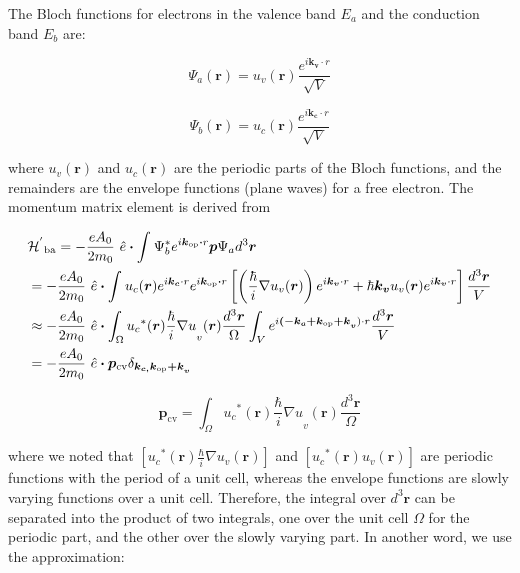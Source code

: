 The Bloch functions for electrons in the valence band \(E_{a}\) and the
conduction band \(E_{b}\) are:

\begin{equation}
\Psi_{a}\left( \bm{r} \right) = u_{v}(\bm{r})\frac{e^{i\bm{k}_{\bm{v}} \cdot r}}{\sqrt{V}}
\end{equation}

\begin{equation}
\Psi_{b}\left( \bm{r} \right) = u_{c}(\bm{r})\frac{e^{i\bm{k}_{\bm{c}} \cdot r}}{\sqrt{V}}
\end{equation}

where \(u_{v}(\bm{r})\) and \(u_{c}(\bm{r})\) are the periodic
parts of the Bloch functions, and the remainders are the envelope
functions (plane waves) for a free electron. The momentum matrix element
is derived from

\begin{eqnarray}
  & {\HAM^{'}}_{\text{ba}} = - \frac{eA_{0}}{2m_{0}}\bm{\ }\hat{e}\bm{\cdot}\int_{}^{}{\Psi_{b}^{*}e^{i\bm{k}_{\bm{\text{op}}}\bm{\cdot}r}\bm{p}\Psi_{a}d^{3}\bm{r}} \nonumber \\
  & = - \frac{eA_{0}}{2m_{0}}\bm{\ }\hat{e}\bm{\cdot}\int_{}^{}{u_{c}(\bm{r})e^{i\bm{k}_{\bm{c}} \cdot r}e^{i\bm{k}_{\bm{\text{op}}}\bm{\cdot}r}\left\lbrack \left( \frac{\hbar}{i}\nabla u_{v}(\bm{r}) \right)e^{i\bm{k}_{\bm{v}} \cdot r} + \hbar\bm{k}_{\bm{v}}u_{v}(\bm{r})e^{i\bm{k}_{\bm{v}} \cdot r} \right\rbrack\frac{d^{3}\bm{r}}{V}} \nonumber \\
  & \approx - \frac{eA_{0}}{2m_{0}}\bm{\ }\hat{e}\bm{\cdot}\int_{\Omega}^{}{{u_{c}}^{*}(\bm{r}){\frac{\hbar}{i}\nabla u}_{v}(\bm{r})}\frac{d^{3}\bm{r}}{\Omega}\int_{V}^{}e^{i{\bm{( -}\bm{k}_{\bm{c}}\bm{+}\bm{k}_{\bm{\text{op}}}\bm{+ k}}_{\bm{v}}) \cdot r}\frac{d^{3}\bm{r}}{V} \nonumber \\
  & = - \frac{eA_{0}}{2m_{0}}\bm{\ }\hat{e}\bm{\cdot}\bm{p}_{\text{cv}}\delta_{{\bm{k}_{\bm{c,}}\bm{k}_{\bm{\text{op}}}\bm{+ k}}_{\bm{v}}}
\end{eqnarray}

\begin{equation}
\bm{p}_{\text{cv}}\bm{=}\int_{\Omega}^{}{{u_{c}}^{*}(\bm{r}){\frac{\hbar}{i}\nabla u}_{v}(\bm{r})}\frac{d^{3}\bm{r}}{\Omega}
\end{equation}

where we noted that
\(\left\lbrack {u_{c}}^{*}(\bm{r})\frac{\hbar}{i}\nabla u_{v}(\bm{r}) \right\rbrack\)
and
\(\left\lbrack {u_{c}}^{*}(\bm{r})u_{v}(\bm{r}) \right\rbrack\)
are periodic functions with the period of a unit cell, whereas the
envelope functions are slowly varying functions over a unit cell.
Therefore, the integral over \(d^{3}\bm{r}\) can be separated into
the product of two integrals, one over the unit cell \(\Omega\) for the
periodic part, and the other over the slowly varying part. In another
word, we use the approximation:

